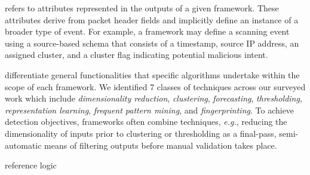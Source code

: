 \documentclass[manuscript,nonacm]{acmart}
\begin{document}

\vspace{0.25em}
 refers to attributes represented in the outputs of a given framework.
These attributes derive from packet header fields and implicitly define an instance of a broader type of event.
For example, a framework may define a scanning event using a source-based schema that consists of a timestamp, source IP address, an assigned cluster, and a cluster flag indicating potential malicious intent.

\vspace{0.25em}
 differentiate general functionalities that specific algorithms undertake within the scope of each framework.
We identified 7 classes of techniques across our surveyed work which include \textit{dimensionality reduction}, \textit{clustering}, \textit{forecasting}, \textit{thresholding}, \textit{representation learning},
\textit{frequent pattern mining}, and \textit{fingerprinting}. 
To achieve detection objectives, frameworks often combine techniques, \textit{e.g.}, reducing the dimensionality of inputs prior to clustering or 
thresholding as a final-pass, semi-automatic means of filtering outputs before manual validation takes place.



\vspace{0.25em}
 reference logic 
\end{document}
